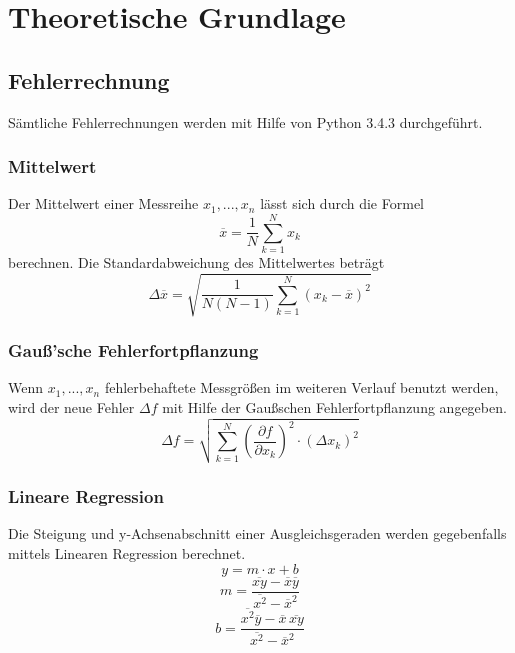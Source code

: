 \section{Theoretische Grundlage}
\label{sec:Theorie}










\subsection{Fehlerrechnung}
Sämtliche Fehlerrechnungen werden mit Hilfe von Python 3.4.3 durchgeführt.
\subsubsection{Mittelwert}
Der Mittelwert einer Messreihe $x_1, ... ,x_n$ lässt sich durch die Formel
\begin{equation}
	\overline{x} = \frac{1}{N} \sum_{k=1}^N x_k
\end{equation}
berechnen. Die Standardabweichung des Mittelwertes beträgt 
\begin{equation}
	\Delta \overline{x} = \sqrt{ \frac{1}{N(N-1)} \sum_{k=1}^N (x_k - \overline{x})^2}
\end{equation}

\subsubsection{Gauß'sche Fehlerfortpflanzung}
Wenn $x_1, ..., x_n$ fehlerbehaftete Messgrößen im weiteren Verlauf benutzt werden, wird der neue Fehler $\Delta f$ mit Hilfe der Gaußschen Fehlerfortpflanzung angegeben.
\begin{equation}
	\Delta f = \sqrt{\sum_{k=1}^N \left( \frac{ \partial f}{\partial x_k} \right) ^2 \cdot (\Delta x_k)^2}
\end{equation}

\subsubsection{Lineare Regression}
Die Steigung und y-Achsenabschnitt einer Ausgleichsgeraden werden gegebenfalls mittels Linearen Regression berechnet. 
\begin{equation}
	y = m \cdot x + b
\end{equation}
\begin{equation}
	m = \frac{ \overline{xy} - \overline{x} \overline{y} } {\overline{x^2} - \overline{x}^2}
\end{equation}
\begin{equation}
	b = \frac{ \overline{x^2}\overline{y} - \overline{x} \, \overline{xy}} { \overline{x^2} - \overline{x}^2}
\end{equation}

\cite{sample}
